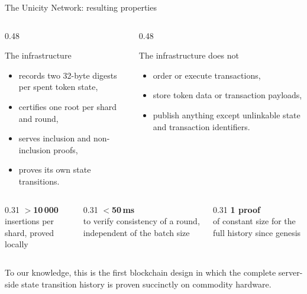 \documentclass[aspectratio=169,10pt]{beamer}
\begin{document}
\begin{frame}{The Unicity Network: resulting properties}
\begin{columns}[T]
\begin{column}{0.48\textwidth}
\begin{block}{The infrastructure}
\small
\begin{itemize}
  \item records two 32-byte digests per spent token state,
  \item certifies one root per shard and round,
  \item serves inclusion and non-inclusion proofs,
  \item proves its own state transitions.
\end{itemize}
\end{block}
\end{column}
\begin{column}{0.48\textwidth}
\begin{block}{The infrastructure does not}
\small
\begin{itemize}
  \item order or execute transactions,
  \item store token data or transaction payloads,
  \item publish anything except unlinkable state and transaction identifiers.
\end{itemize}
\end{block}
\end{column}
\end{columns}

\vspace{4mm}
\begin{columns}[T]
\begin{column}{0.31\textwidth}\centering
{\Large\bfseries\color{uOrange} $>$10\,000}\\[1pt]\footnotesize insertions per shard, proved locally
\end{column}
\begin{column}{0.31\textwidth}\centering
{\Large\bfseries\color{uOrange} $<$50\,ms}\\[1pt]\footnotesize to verify consistency of a round, independent of the batch size
\end{column}
\begin{column}{0.31\textwidth}\centering
{\Large\bfseries\color{uOrange} 1 proof}\\[1pt]\footnotesize of constant size for the full history since genesis
\end{column}
\end{columns}

\vspace{4mm}
\small To our knowledge, this is the first blockchain design in which the complete server-side state transition history is proven succinctly on commodity hardware.
\end{frame}
\end{document}
